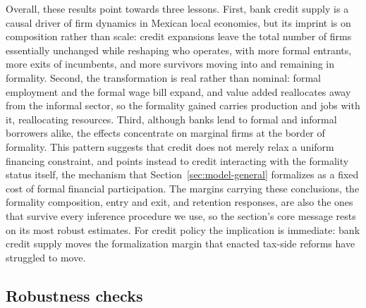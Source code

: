 \documentclass[12pt]{article}
\begin{document}
\begin{table}[H]
    \caption{Shift-Share IV estimates of the effect of bank shocks on workers, wagebill, and value added}
    \label{main_econ_table}
    \centering
    \small
    
\end{table}




Overall, these results point towards three lessons. First, bank credit supply is a causal driver of firm dynamics in Mexican local economies, but its imprint is on composition rather than scale: credit expansions leave the total number of firms essentially unchanged while reshaping who operates, with more formal entrants, more exits of incumbents, and more survivors moving into and remaining in formality. Second, the transformation is real rather than nominal: formal employment and the formal wage bill expand, and value added reallocates away from the informal sector, so the formality gained carries production and jobs with it, reallocating resources. Third, although banks lend to formal and informal borrowers alike, the effects concentrate on marginal firms at the border of formality. This pattern suggests that credit does not merely relax a uniform financing constraint, and points instead to credit interacting with the formality status itself, the mechanism that Section~\ref{sec:model-general} formalizes as a fixed cost of formal financial participation. The margins carrying these conclusions, the formality composition, entry and exit, and retention responses, are also the ones that survive every inference procedure we use, so the section's core message rests on its most robust estimates. For credit policy the implication is immediate: bank credit supply moves the formalization margin that enacted tax-side reforms have struggled to move.

\subsection{Robustness checks} \label{robustness}
\end{document}
